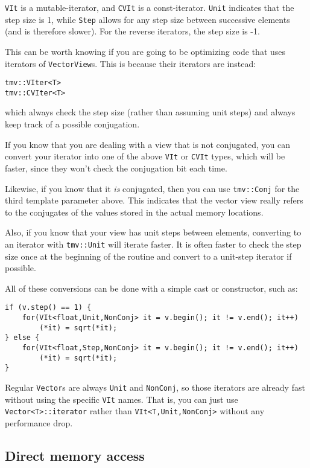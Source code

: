 \documentclass[twoside,letterpaper,11pt]{article}
\renewcommand{\tt}[1]{{\texttt {#1}}}
\begin{document}
\tt{VIt} is a mutable-iterator, and \tt{CVIt} is a const-iterator.  \tt{Unit} 
indicates that the step size is 1, while \tt{Step} allows for any step size
between successive elements (and is therefore slower).  For the reverse
iterators, the step size is -1.

This can be worth knowing if you are going to be optimizing code that uses
iterators of \tt{VectorView}s.
This is because their iterators are instead:
\begin{verbatim}
tmv::VIter<T>
tmv::CVIter<T>
\end{verbatim}
which always check the step size (rather than assuming unit steps) and always
keep track of a possible conjugation.

If you know that you are dealing with a view that is not conjugated, you can 
convert your iterator into one of the above \tt{VIt} or \tt{CVIt} types, which will be 
faster, since they won't check the conjugation bit each time. 

Likewise, if you
know that it {\em is} conjugated, then you can use \tt{tmv::Conj} for the 
third template parameter above.  This indicates that the vector view really
refers to the conjugates of the values stored in the actual memory locations.

Also, if you know that your view has unit steps between elements, converting to 
an iterator with \tt{tmv::Unit} will iterate faster.  It is often faster to check
the step size once at the beginning of the routine and convert to a unit-step
iterator if possible.

All of these conversions can be done with a simple cast or constructor, such as:
\begin{verbatim}
if (v.step() == 1) {
    for(VIt<float,Unit,NonConj> it = v.begin(); it != v.end(); it++)
        (*it) = sqrt(*it);
} else {
    for(VIt<float,Step,NonConj> it = v.begin(); it != v.end(); it++)
        (*it) = sqrt(*it);
}
\end{verbatim}

Regular \tt{Vector}s are always \tt{Unit} and \tt{NonConj}, so those iterators
are already fast without using the specific \tt{VIt} names. 
That is, you can just use \tt{Vector<T>::iterator} rather than \tt{VIt<T,Unit,NonConj>}
without any performance drop.

\subsection{Direct memory access}
\end{document}
